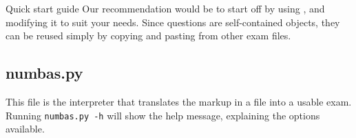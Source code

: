 \begin{chapter}{\label{cha:quickstart}Quick start guide}
  Our recommendation would be to start off by using ,
  and modifying it to suit your needs.  Since questions are self-contained
  objects, they can be reused simply by copying and pasting from other exam
  files.

  \subsection{numbas.py}
  This file is the interpreter that translates the markup in a 
  file into a usable exam.  Running \verb"numbas.py -h" will show the
  help message, explaining the options available.
\end{chapter}
